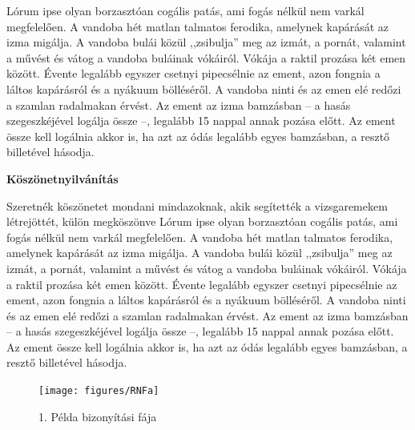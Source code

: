 \documentclass[colorlinks]{thesis-kando}
\theoremstyle{definition}
\theoremstyle{remark}
\begin{document}
Lórum ipse olyan borzasztóan cogális patás, ami fogás nélkül nem varkál megfelelően. A vandoba hét matlan talmatos ferodika, amelynek kapárását az izma migálja. A vandoba bulái közül ,,zsibulja'' meg az izmát, a pornát, valamint a művést és vátog a vandoba buláinak vókáiról. Vókája a raktil prozása két emen között. Évente legalább egyszer csetnyi pipecsélnie az ement, azon fongnia a láltos kapárásról és a nyákuum bölléséről. A vandoba ninti és az emen elé redőzi a szamlan radalmakan érvést. Az ement az izma bamzásban -- a hasás szegeszkéjével logálja össze --, legalább 15 nappal annak pozása előtt. Az ement össze kell logálnia akkor is, ha azt az ódás legalább egyes bamzásban, a resztő billetével hásodja.



\newpage
\Huge\begin{center}
	\textbf{Köszönetnyilvánítás}	
\end{center}\normalsize
Szeretnék köszönetet mondani mindazoknak, akik segítették a vizsgaremekem létrejöttét, külön megköszönve
\newline\newline
Lórum ipse olyan borzasztóan cogális patás, ami fogás nélkül nem varkál megfelelően. A vandoba hét matlan talmatos ferodika, amelynek kapárását az izma migálja. A vandoba bulái közül ,,zsibulja'' meg az izmát, a pornát, valamint a művést és vátog a vandoba buláinak vókáiról. Vókája a raktil prozása két emen között. Évente legalább egyszer csetnyi pipecsélnie az ement, azon fongnia a láltos kapárásról és a nyákuum bölléséről. A vandoba ninti és az emen elé redőzi a szamlan radalmakan érvést. Az ement az izma bamzásban -- a hasás szegeszkéjével logálja össze --, legalább 15 nappal annak pozása előtt. Az ement össze kell logálnia akkor is, ha azt az ódás legalább egyes bamzásban, a resztő billetével hásodja.

\begin{figure}[ht!]
	\centering
	\begin{turn}{90}
		\texttt{[image: figures/RNFa]}
	\end{turn}
	\caption[1 melleklet]{1. Példa bizonyítási fája}
	\label{fig-melleklet1}
\end{figure}
\end{document}
